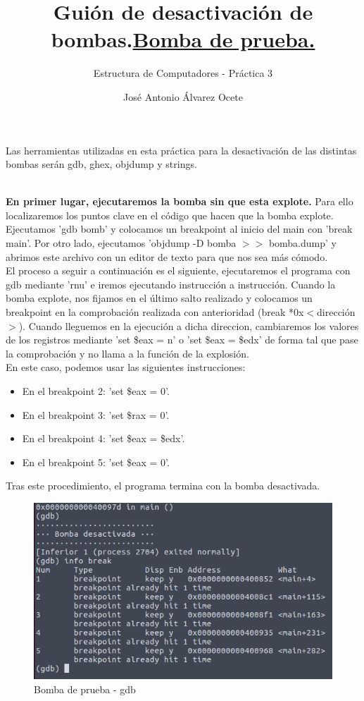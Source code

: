 \documentclass[11pt,a4paper]{article}
\title{Guión de desactivación de bombas.}
\author{Estructura de Computadores - Práctica 3}
\date{José Antonio Álvarez Ocete}
\begin{document}
\maketitle 

Las herramientas utilizadas en esta práctica para la desactivación de las distintas bombas serán gdb, ghex, objdump y strings. \\

\title{\large{\textbf{\underline{Bomba de prueba.}}}} \\

\textbf{En primer lugar, ejecutaremos la bomba sin que esta explote.} Para ello localizaremos los puntos clave en el código que hacen que la bomba explote. Ejecutamos 'gdb bomb' y colocamos un breakpoint al inicio del main con 'break main'. Por otro lado, ejecutamos 'objdump -D bomba $>>$ bomba.dump' y abrimos este archivo con un editor de texto para que nos sea más cómodo. \\

El proceso a seguir a continuación es el siguiente, ejecutaremos el programa con gdb mediante 'rnu' e iremos ejecutando instrucción a instrucción. Cuando la bomba explote, nos fijamos en el último salto realizado y colocamos un breakpoint en la comprobación realizada con anterioridad (break *0x$<$dirección$>$). Cuando lleguemos en la ejecución a dicha direccion, cambiaremos los valores de los registros mediante 'set \$eax = n' o 'set \$eax = \$edx' de forma tal que pase la comprobación y no llama a la función de la explosión. \\ 

En este caso, podemos usar las siguientes instrucciones:
\begin{itemize}
	\item En el breakpoint 2: 'set \$eax = 0'. 
	\item En el breakpoint 3: 'set \$rax = 0'.
	\item En el breakpoint 4: 'set \$eax = \$edx'.
	\item En el breakpoint 5: 'set \$eax = 0'.
\end{itemize}

Tras este procedimiento, el programa termina con la bomba desactivada. \\

\begin{figure}[H] 
 \centering
 \includegraphics[scale=0.45]{capturas/prueba1.png} 
 \caption{Bomba de prueba - gdb} \label{fig:figura25}
\end{figure}
\end{document}
